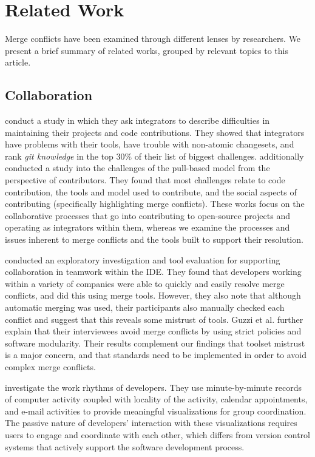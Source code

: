 
\section{Related Work}\label{related_work}

Merge conflicts have been examined through different lenses by researchers. We present a brief summary of related works, grouped by relevant topics to this article.

\subsection{Collaboration}

\citet{integrator_perspective} conduct a study in which they ask integrators to describe difficulties in maintaining their projects and code contributions. 
They showed that integrators have problems with their tools, have trouble with non-atomic changesets, and rank \textit{git knowledge} in the top 30\% of their list of biggest challenges. 
\citet{gousios2016work} additionally conducted a study into the challenges of the pull-based model from the perspective of contributors. 
They found that most challenges relate to code contribution, the tools and model used to contribute, and the social aspects of contributing (specifically highlighting merge conflicts).
These works focus on the collaborative processes that go into contributing to open-source projects and operating as integrators within them, whereas we examine the processes and issues inherent to merge conflicts and the tools built to support their resolution.

\citet{Guzzi2015} conducted an exploratory investigation and tool evaluation for supporting collaboration in teamwork within the IDE.
They found that developers working within a variety of companies were able to quickly and easily resolve merge conflicts, and did this using merge tools.
However, they also note that although automatic merging was used, their participants also manually checked each conflict and suggest that this reveals some mistrust of tools.
Guzzi et al. further explain that their interviewees avoid merge conflicts by using strict policies and software modularity.
Their results complement our findings that toolset mistrust is a major concern, and that standards need to be implemented in order to avoid complex merge conflicts.

\citet{begole_work_2002} investigate the work rhythms of developers.
They use minute-by-minute records of computer activity coupled with locality of the activity, calendar appointments, and e-mail activities to provide meaningful visualizations for group coordination.
The passive nature of developers' interaction with these visualizations requires users to engage and coordinate with each other, which differs from version control systems that actively support the software development process.


